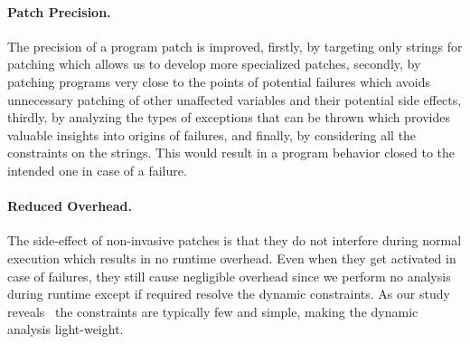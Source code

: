 {\paragraph{Patch Precision.} The precision of a program patch is improved,
firstly, by targeting only strings
for patching which allows us to develop more specialized patches, secondly, by
patching programs very
close to the points of potential failures which avoids unnecessary patching of
other
unaffected variables and their potential
side effects, thirdly, by analyzing the types of exceptions that can be thrown
which
provides valuable insights into
origins of failures, and finally, by considering all the constraints
on the strings. This would result
in a program behavior closed to the intended one in case of a failure.

\paragraph{Reduced Overhead.} The side-effect of non-invasive patches is that
they do not interfere during
normal execution which results in no runtime overhead. Even when they get
activated in case of failures,
they still cause negligible overhead since we perform no analysis during runtime
except if required resolve the dynamic constraints.
As our study reveals~ the constraints are typically few and
simple, making
the dynamic analysis light-weight.
}

